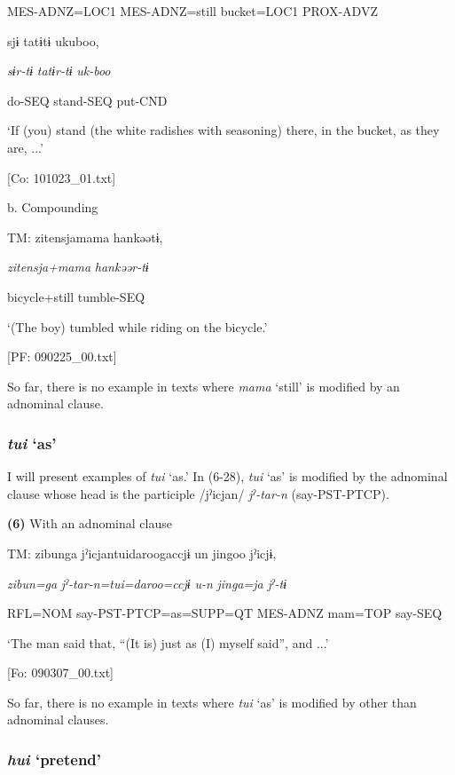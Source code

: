       MES-ADNZ=LOC1  MES-ADNZ=still  bucket=LOC1  PROX-ADVZ

      sjɨ  tatɨtɨ  ukuboo,

      \textit{sɨr-tɨ}  \textit{tatɨr-tɨ}  \textit{uk-boo}

      do-SEQ  stand-SEQ  put-CND

      ‘If (you) stand (the white radishes with seasoning) there, in the bucket, as they are, ...’

      [Co: 101023\_01.txt]

  b.  Compounding

    TM:  {\textbar}zitensja{\textbar}mama  hankəətɨ,

      \textit{zitensja+mama}  \textit{hankəər-tɨ}

      bicycle+still  tumble-SEQ

      ‘(The boy) tumbled while riding on the bicycle.’

      [PF: 090225\_00.txt]

So far, there is no example in texts where \textit{mama} ‘still’ is modified by an adnominal clause.

\subsubsection{ \textit{tui} ‘as’}

I will present examples of \textit{tui} ‘as.’ In (6-28), \textit{tui} ‘as’ is modified by the adnominal clause whose head is the participle /jˀicjan/ \textit{jˀ-tar-n} (say-PST-PTCP).

\textbf{(6)}  With an adnominal clause

  TM:  {\textbar}zibunga{\textbar}  jˀicjantuidaroogaccjɨ  un  jingoo  jˀicjɨ,

    \textit{zibun=ga}  \textit{jˀ-tar-n=tui=daroo=ccjɨ}  \textit{u-n}  \textit{jinga=ja}  \textit{jˀ-tɨ}

    RFL=NOM  say-PST-PTCP=as=SUPP=QT  MES-ADNZ  mam=TOP  say-SEQ

    ‘The man said that, “(It is) just as (I) myself said”, and ...’

    [Fo: 090307\_00.txt]

So far, there is no example in texts where \textit{tui} ‘as’ is modified by other than adnominal clauses.

\subsubsection{ \textit{hui} ‘pretend’}

